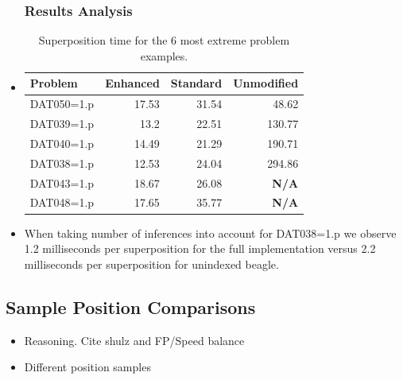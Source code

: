 \documentclass[10pt,xcolor={dvipsnames}]{beamer}
\begin{document}
\begin{NoHyper}
\begin{frame}
  \begin{itemize}
  \frametitle{Results Analysis}
  \item<1->[]
 \begin{table}[H]\scriptsize
  \caption{Superposition time for the 6 most extreme problem examples.}
\begin{tabular}{| l || r | r | r |}  \hline
Problem&Enhanced&Standard&Unmodified\\  \hline
DAT050=1.p&17.53& 31.54& 48.62\\
DAT039=1.p&13.2& 22.51& 130.77\\
DAT040=1.p&14.49& 21.29& 190.71\\
DAT038=1.p&12.53& 24.04& 294.86\\
DAT043=1.p&18.67& 26.08& \textbf{N/A} \\
DAT048=1.p&17.65& 35.77& \textbf{N/A}\\\hline
\end{tabular}\end{table}
  \item<2-> When taking number of inferences into account for DAT038=1.p we observe
  1.2 milliseconds per superposition for the full implementation versus 2.2 milliseconds
  per superposition for unindexed beagle.
  \end{itemize}
\end{frame}

\subsection{Sample Position Comparisons}
\begin{frame}
  \begin{itemize}
  \frametitle{Fingerprint Sampling Varieties}
  \item<1-> Reasoning. Cite shulz and FP/Speed balance
  \item<2-> Different position samples
  \end{itemize}
\end{frame}


\end{NoHyper}
\end{document}
